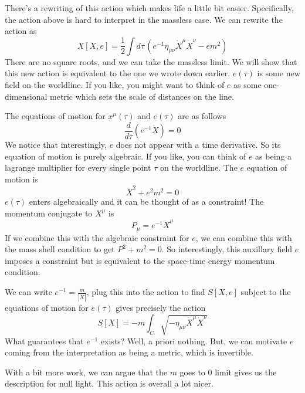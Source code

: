 \documentclass[11pt, oneside]{article}   	%
\theoremstyle{slanted}
\begin{document}
There's a rewriting 
of this action which makes life a little bit easier. 
Specifically, the action above is 
hard to interpret in the massless case. 
We can rewrite the action 
as \[
X\left[  X , e  \right]    = \frac{1}{2 } \int 
d \tau \, (  e ^{ -1 } \eta _{ \mu \nu } \dot{ X } ^ \mu \dot{ X} ^ \nu   
- e m ^ 2 ) 
\] There are no square roots, and we can take the massless limit. 
We will show that this new action is equivalent to 
the one we wrote down earlier. 
$ e \left( \tau  \right)  $ is some new field on the worldline. 
If you like, you might want to 
think of $ e $ as some one-dimensional metric which 
sets the scale of distances on the line. 

The equations of motion for $ x ^ \mu \left( \tau  \right)  $ 
and $ e \left( \tau  \right)  $ are as follows 
\[
\frac{d }{ d \tau } \left( e ^{ - 1 } \dot{ X }   \right)  = 0 
\] We notice that interestingly, $ e $ does not appear with a time 
derivative. So its equation of 
motion is purely algebraic. If you like, you 
can think of $ e $ as being a lagrange multiplier 
for every single point $ \tau $ on the worldline. 
The $ e $ equation of motion is 
\[
\dot{ X } ^ 2 + e ^ 2 m ^ 2  = 0  
\] $ e \left( \tau  \right)  $ enters 
algebraically 
and it can be thought of 
as a constraint! 
The momentum conjugate to $ X ^ \mu $ 
is 
\[
P _ \mu  = e ^{ - 1 } \dot{ X } ^ \mu  
\] If we combine this with the algebraic constraint
for $ e $, we can combine this with the mass shell 
condition 
to get $ P ^ 2 + m ^ 2  = 0 $. 
So interestingly, this auxillary field $ e $ 
imposes a constraint but is equivalent to 
the space-time energy momentum condition. 

We can write $ e ^{ - 1 }  = \frac{ m }{ | \dot{ X }  |  } $, 
plug this into the action 
to find $ S \left[  X , e  \right]  $ 
subject to the equations of motion 
for $ e \left( \tau  \right)  $ gives 
precisely the action 
\[
S\left[  X  \right]   =  - m \int_{ C } \sqrt{  - \eta _{ \mu \nu } \dot{ X } ^ \mu 
\dot{ X } ^ \nu  }  
\] What guarantees that $ e ^{ - 1 }  $ exists? 
Well, a priori nothing. But, we 
can motivate $ e $ coming from 
the interpretation as being a metric, 
which is invertible. 

With a bit more work, 
we can argue that the $ m $ goes to 
$ 0 $ limit gives 
us the description for null light. 
This action is overall a lot nicer. 
\end{document}
